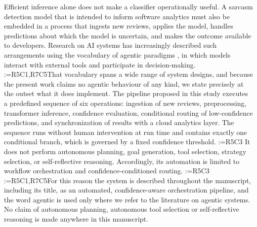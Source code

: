 \documentclass[a4paper,fleqn]{cas-sc}
\makeatletter
\newif\iftracked
\newcommand{\rv@setcolour}[1]{%
  \IfStrEq{#1}{R7C7}{\color{rvEdit}}{%
    \IfSubStr{#1}{R5}{\IfSubStr{#1}{R7}{\color{rvBoth}}{\color{rvFive}}}{\color{rvSeven}}}}
\newcommand{\rv@tag}[1]{\textsuperscript{\sffamily\bfseries\scriptsize[\StrSubstitute{#1}{,}{, }]}\,}
\newcommand{\rv@recordone}[1]{%
  \edef\rv@i{#1}%
  \ifcsdef{rv@n@\rv@i}{}{\csgdef{rv@n@\rv@i}{0}}%
  \csxdef{rv@n@\rv@i}{\the\numexpr\csuse{rv@n@\rv@i}+1\relax}%
  \begingroup\edef\@currentlabel{\rv@i}\label{rv:\rv@i:\csuse{rv@n@\rv@i}}\endgroup}
\newcommand{\rv@record}[1]{\@for\rv@id:=#1\do{\expandafter\rv@recordone\expandafter{\rv@id}}}
\DeclareRobustCommand{\rcdel}[2]{\rv@record{#1}\iftracked{\rv@setcolour{#1}\rv@tag{#1}\rv@strike{#2}}\else\unskip\fi}
\DeclareRobustCommand{\rcrep}[3]{\rv@record{#1}\iftracked{\rv@setcolour{#1}\rv@tag{#1}\rv@strike{#2} #3}\else#3\fi}
\makeatother
\begin{document}
Efficient inference alone does not make a classifier operationally useful. A sarcasm detection model that is intended to inform software analytics must also be embedded in a process that ingests new reviews, applies the model, handles predictions about which the model is uncertain, and makes the outcome available to developers. Research on AI systems has increasingly described such arrangements using the vocabulary of agentic paradigms \citep{yasmin2025empirical,jiang2026large}, in which models interact with external tools and participate in decision-making. \rcrep{R5C1,R7C5}{That vocabulary spans a wide range of system designs, and we therefore state at the outset, and precisely, what the present work does and does not implement, so that this definition governs the terminology used throughout the manuscript.}{That vocabulary spans a wide range of system designs, and because the present work claims no agentic behaviour of any kind, we state precisely at the outset what it does implement.} The pipeline proposed in this study executes a predefined sequence of six operations: ingestion of new reviews, preprocessing, transformer inference, confidence evaluation, conditional routing of low-confidence predictions, and synchronization of results with a cloud analytics layer. The sequence runs without human intervention at run time and contains exactly one conditional branch, which is governed by a fixed confidence threshold. \rcdel{R5C3}{The pipeline executes a predefined sequence of six operations: review ingestion, preprocessing, transformer inference, confidence evaluation, confidence-based routing, and cloud synchronization. It contains a single predefined conditional branch governed by a fixed confidence threshold.} It does not perform autonomous planning, goal generation, tool selection, strategy selection, or self-reflective reasoning. Accordingly, its automation is limited to workflow orchestration and confidence-conditioned routing. \rcdel{R5C3}{Its automation is therefore confined to orchestration and confidence-conditioned routing.} \rcrep{R5C1,R7C5}{We use the term automated, confidence-aware orchestration pipeline in the technical sections of this manuscript. Where the word agentic appears, including in the title, it denotes only this restricted orchestration and routing behaviour, and it should not be read as a claim of general-purpose autonomous agency.}{For this reason the system is described throughout the manuscript, including its title, as an automated, confidence-aware orchestration pipeline, and the word agentic is used only where we refer to the literature on agentic systems.} No claim of autonomous planning, autonomous tool selection or self-reflective reasoning is made anywhere in this manuscript.
\end{document}
